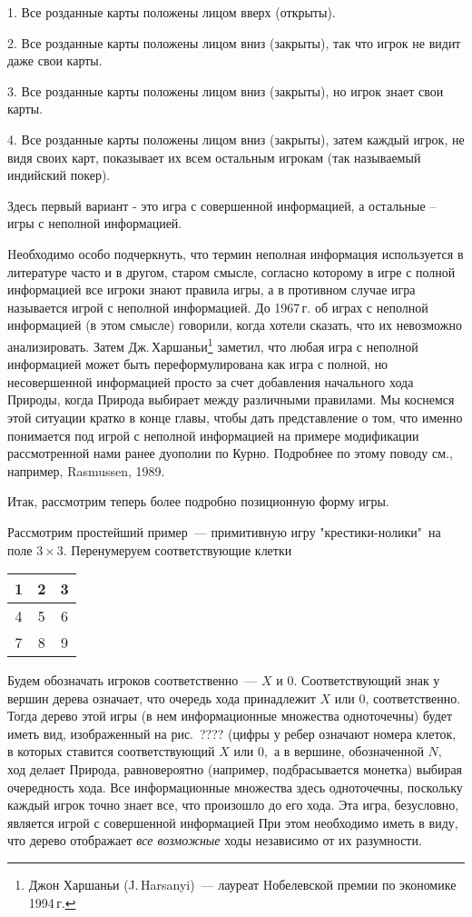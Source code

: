 1. Все розданные карты положены лицом вверх (открыты).

2. Все розданные карты положены лицом вниз (закрыты), так что игрок
не видит даже свои карты.

3. Все розданные карты положены лицом вниз (закрыты), но игрок знает
свои карты.

4. Все розданные карты положены лицом вниз (закрыты), затем каждый
игрок, не видя своих карт, показывает их всем остальным игрокам (так
называемый индийский покер).

Здесь первый вариант - это игра с совершенной информацией, а
остальные  -- игры с неполной информацией.

Hеобходимо особо подчеркнуть, что термин неполная информация
используется в литературе часто и в другом, старом смысле, согласно
которому в игре с полной информацией все игроки знают правила игры,
а в противном случае игра называется игрой с неполной информацией.
До 1967\,г. об играх с неполной информацией (в этом смысле)
говорили, когда хотели сказать, что их невозможно анализировать.
Затем Дж.\,Харшаньи\footnote{ Джон Харшаньи (J.\,Harsanyi)~---
лауреат Hобелевской премии по экономике 1994\,г.} заметил, что любая
игра с неполной информацией может быть переформулирована как игра с
полной, но несовершенной информацией просто за счет добавления
начального хода Природы, когда Природа выбирает между различными
правилами. Мы коснемся этой ситуации кратко в конце главы, чтобы
дать представление о том, что именно понимается под игрой с неполной
информацией на примере модификации рассмотренной нами ранее дуополии
по Курно. Подробнее по этому поводу см., например,  Rasmussen, 1989.

Итак, рассмотрим теперь более подробно  позиционную форму игры.

Рассмотрим простейший пример~--- примитивную игру
"крестики-нолики"\, на поле $3\times 3$. Перенумеруем
соответствующие клетки

\begin{center}
\begin{tabular}{|c|c|c|}\hline
1&2&3\\ \hline 4&5&6\\ \hline 7&8&9\\ \hline
\end{tabular}
\end{center}

Будем обозначать игроков соответственно~--- $X$ и $0$.
Соответствующий знак у вершин дерева означает, что очередь хода
принадлежит $X$ или $0$, соответственно. Тогда дерево этой игры (в
нем информационные множества одноточечны) будет иметь вид,
изображенный на рис.\, ???? (цифры у ребер означают номера клеток,
в которых ставится соответствующий $X$ или $0,$ а в вершине,
обозначенной $N,$ ход делает Природа, равновероятно (например,
подбрасывается монетка) выбирая очередность хода. Все
информационные множества здесь одноточечны, поскольку каждый игрок
точно знает все, что произошло до его хода. Эта игра, безусловно,
является игрой с совершенной информацией При этом необходимо иметь
в виду, что дерево отображает {\it все возможные} ходы независимо
от их разумности.


